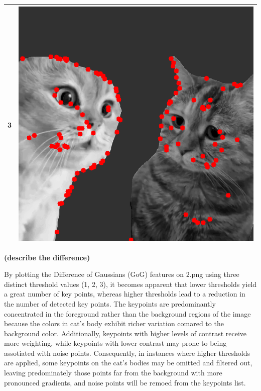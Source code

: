 \documentclass[a4paper, 12pt]{article}
\begin{document}
\begin{table}[!htb]
\begin{tabular}{|c|c|}
        \hline
        3         & \includegraphics[scale=0.4]{part1/result/DoG_2_3.0_result.png} \\
        \hline
    \end{tabular}
\end{table}

\clearpage

\begin{center}
    \textbf{(describe the difference)}
\end{center}

By plotting the Difference of Gaussians (GoG) features on 2.png using three distinct threshold values (1, 2, 3), it becomes apparent that lower thresholds yield a great number of key points, whereas higher thresholds lead to a reduction in the number of detected key points. The keypoints are predominantly concentrated in the foreground rather than the background regions of the image because the colors in cat's body exhibit richer variation comared to the background color. Additionally, keypoints with higher levels of contrast receive more weighting, while keypoints with lower contrast may prone to being assotiated with noise points. Consequently, in instances where higher thresholds are applied, some keypoints on the cat's bodies may be omitted and filtered out, leaving predominately those points far from the background with more pronounced gradients, and noise points will be remoed from the keypoints list.
\end{document}
